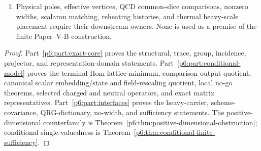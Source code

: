 \documentclass[12pt,a4paper]{article}
\begin{document}
\begin{theorem}
\begin{enumerate}[label=(\roman*),leftmargin=2em]
\item Physical poles, effective vertices, QCD common-slice comparisons,
nonzero widths, scalaron matching, reheating histories, and thermal
heavy-scale placement require their downstream owners.  None is used as a
premise of the finite Paper--V-B construction.
\end{enumerate}
\end{theorem}

\begin{proof}
Part~\ref{p6:part:exact-core} proves the structural, trace, group, incidence,
projector, and representation-domain statements.  Part~\ref{p6:part:conditional-model}
proves the terminal Hom-lattice minimum, comparison-output quotient, canonical
scalar embedding/state and field-rescaling quotient, local no-go theorems,
selected charged and neutral operators, and exact matrix representatives.
Part~\ref{p6:part:interfaces}
proves the heavy-carrier, scheme-covariance, QRG-dictionary, no-width, and
sufficiency statements.  The positive-dimensional counterfamily is
Theorem~\ref{p6:thm:positive-dimensional-obstruction}; conditional
single-valuedness is
Theorem~\ref{p6:thm:conditional-finite-sufficiency}.
\end{proof}
\end{document}
